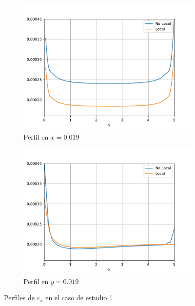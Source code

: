 \begin{figure}
\begin{subfigure}{0.48\textwidth}
	    \centering
	        \includegraphics[width=\textwidth]{figuras/PerfilX0019.pdf}
	        \caption{Perfil en $x=0.019$}
	        \label{fig:perfiles_validacion.x0019}
	    \end{subfigure}
	    \begin{subfigure}{0.48\textwidth}
	    \centering
	        \includegraphics[width=\textwidth]{figuras/PerfilY0019.pdf}
	        \caption{Perfil en $y=0.019$}
	        \label{fig:perfiles_validacion.y0019}
	    \end{subfigure}
	    \caption{Perfiles de $\varepsilon_x$ en el caso de estudio 1}
	    \label{fig:perfiles_validacion}
	\end{figure}

